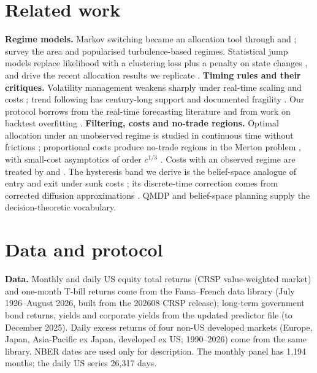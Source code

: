 \documentclass[sigconf,nonacm]{acmart}
\begin{document}
\section{Related work}
\textbf{Regime models.} Markov switching \cite{hamilton1989} became an allocation tool through \citet{ang2002international,ang2004regimes} and \citet{guidolin2007asset}; \citet{ang2012regime} survey the area and \citet{kritzman2012regime} popularised turbulence-based regimes. Statistical jump models replace likelihood with a clustering loss plus a penalty on state changes \cite{nystrup2020penalizing,nystrup2020greedy,aydinhan2024identifying}, and drive the recent allocation results we replicate \cite{shu2024downside,shu2025factor}.
\textbf{Timing rules and their critiques.} Volatility management \cite{fleming2001economic,moreira2017volatility} weakens sharply under real-time scaling and costs \cite{liu2019volatility,cederburg2020performance,barroso2021limits}; trend following has century-long support \cite{hurst2017century,moskowitz2012tsmom} and documented fragility \cite{huang2020tsmom}. Our protocol borrows from the real-time forecasting literature \cite{pesaran1995predictability,welch2008comprehensive,goyal2024comprehensive} and from work on backtest overfitting \cite{bailey2014deflated,bailey2017pbo,harvey2015backtesting}.
\textbf{Filtering, costs and no-trade regions.} Optimal allocation under an unobserved regime is studied in continuous time without frictions \cite{honda2003optimal,rieder2005portfolio,sass2004optimizing}; proportional costs produce no-trade regions in the Merton problem \cite{magill1976portfolio,davis1990portfolio,shreve1994optimal}, with small-cost asymptotics of order $c^{1/3}$ \cite{rogers2004why,soner2013homogenization,kallsen2017general,gerhold2014transaction}. Costs with an observed regime are treated by \citet{jang2007liquidity} and \citet{collindufresne2020liquidity}. The hysteresis band we derive is the belief-space analogue of entry and exit under sunk costs \cite{dixit1989entry}; its discrete-time correction comes from corrected diffusion approximations \cite{siegmund1979corrected,broadie1997continuity}. QMDP \cite{littman1995learning} and belief-space planning \cite{kaelbling1998planning} supply the decision-theoretic vocabulary.

\section{Data and protocol}\label{sec:data}
\textbf{Data.} Monthly and daily US equity total returns (CRSP value-weighted market) and one-month T-bill returns come from the Fama--French data library \cite{french_data_library} (July 1926--August 2026, built from the 202608 CRSP release); long-term government bond returns, yields and corporate yields from the updated \citet{welch2008comprehensive} predictor file (to December 2025). Daily excess returns of four non-US developed markets (Europe, Japan, Asia-Pacific ex Japan, developed ex US; 1990--2026) come from the same library. NBER dates are used only for description. The monthly panel has 1,194 months; the daily US series 26,317 days.
\end{document}
